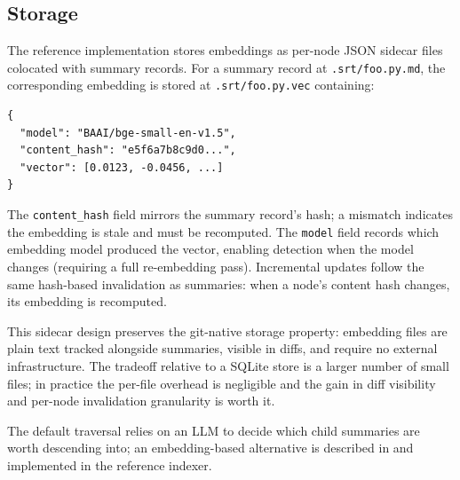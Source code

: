 
\subsection{Storage}

The reference implementation stores embeddings as per-node JSON sidecar files colocated with summary records.
For a summary record at \texttt{.srt/foo.py.md}, the corresponding embedding is stored at \texttt{.srt/foo.py.vec} containing:

\begin{verbatim}
{
  "model": "BAAI/bge-small-en-v1.5",
  "content_hash": "e5f6a7b8c9d0...",
  "vector": [0.0123, -0.0456, ...]
}
\end{verbatim}

The \texttt{content\_hash} field mirrors the summary record's hash; a mismatch indicates the embedding is stale and must be recomputed.
The \texttt{model} field records which embedding model produced the vector, enabling detection when the model changes (requiring a full re-embedding pass).
Incremental updates follow the same hash-based invalidation as summaries: when a node's content hash changes, its embedding is recomputed.

This sidecar design preserves the git-native storage property: embedding files are plain text tracked alongside summaries, visible in diffs, and require no external infrastructure.
The tradeoff relative to a SQLite store is a larger number of small files; in practice the per-file overhead is negligible and the gain in diff visibility and per-node invalidation granularity is worth it.


    \item The default traversal relies on an LLM to decide which child summaries are worth descending into; an embedding-based alternative is described in  and implemented in the reference indexer.


